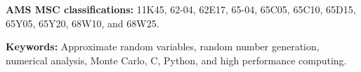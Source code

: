 \documentclass[10pt, a4paper, english, twocolumn]{extarticle}
\begin{document}
\begin{small}
%
\noindent
\textbf{AMS MSC classifications:} 
11K45, %
62-04, %
62E17, %
65-04, %
65C05, %
65C10, %
65D15, %
65Y05, %
65Y20, %
68W10, %
and
68W25. %

\noindent
\textbf{Keywords:} Approximate random variables, random number generation, numerical analysis, Monte Carlo, C, Python, and high performance computing. 
\end{small}












\end{document}
